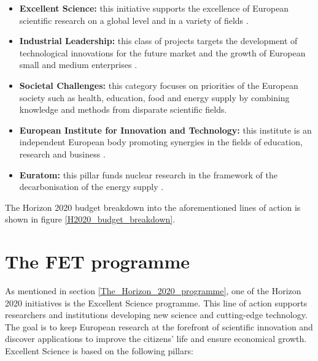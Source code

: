 \begin{itemize}
 \item \textbf{Excellent Science:} this initiative supports the excellence of European scientific research on a global level and in a variety of fields \cite{ExcellentScience}.
 \item \textbf{Industrial Leadership:} this class of projects targets the development of technological innovations for the future market and the growth of European small and medium enterprises \cite{IndustrialLeadership}.
 \item \textbf{Societal Challenges:} this category focuses on priorities of the European society such as health, education, food and energy supply by combining knowledge and methods from disparate scientific fields\cite{SocietalChallenges}.  
 \item \textbf{European Institute for Innovation and Technology:} this institute is an independent European body promoting synergies in the fields of education, research and business \cite{EIT}. 
 \item \textbf{Euratom:} this pillar funds nuclear research in the framework of the decarbonisation of the energy supply \cite{Euratom}.
\end{itemize}
The Horizon 2020 budget breakdown into the aforementioned lines of action is shown in figure \ref{H2020_budget_breakdown}.

\section{The FET programme} \label{The_FET_programme}
As mentioned in section \ref{The_Horizon_2020_programme}, one of the Horizon 2020 initiatives is the Excellent Science programme. This line of action supports researchers and institutions developing new science and cutting-edge technology. The goal is to keep European research at the forefront of scientific innovation and discover applications to improve the citizens' life and ensure economical growth. Excellent Science is based on the following pillars: 

